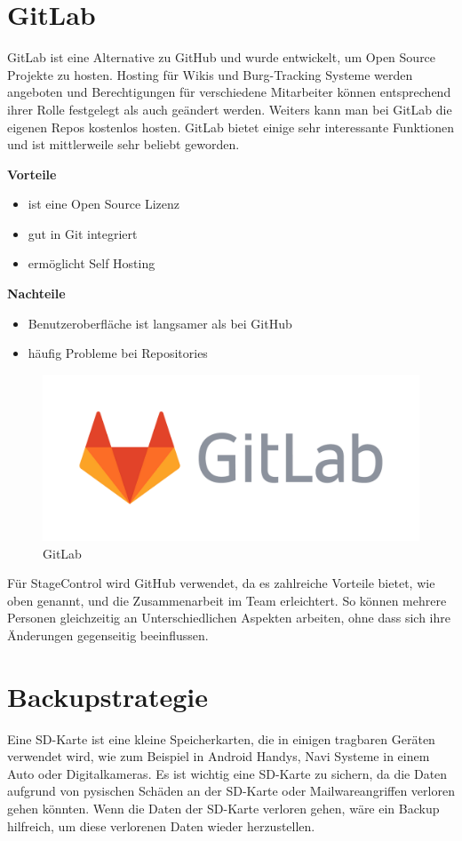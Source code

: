 \newpage
\section{GitLab}
GitLab ist eine Alternative zu GitHub und wurde entwickelt, um Open Source Projekte zu hosten. Hosting für Wikis und Burg-Tracking Systeme werden angeboten und Berechtigungen für verschiedene Mitarbeiter können entsprechend ihrer Rolle festgelegt als auch geändert werden. Weiters kann man bei GitLab die eigenen Repos kostenlos hosten. GitLab bietet einige sehr interessante Funktionen und ist mittlerweile sehr beliebt geworden.   \parencite{GitHubVsGitLab}

\textbf{Vorteile}
\begin{itemize}
	\item ist eine Open Source Lizenz
	\item gut in Git integriert
	\item ermöglicht Self Hosting
\end{itemize}

\textbf{Nachteile}
\begin{itemize}
	\item Benutzeroberfläche ist langsamer als bei GitHub
	\item häufig Probleme bei Repositories 
\end{itemize}


\begin{figure}[H]
	\centering
	\includegraphics[width=0.5\linewidth]{images/GitLab.png}
	\caption[GitLab]{GitLab}
	\label{fig:GitLab}
\end{figure}

Für StageControl wird GitHub verwendet, da es zahlreiche Vorteile bietet, wie oben genannt, und die Zusammenarbeit im Team erleichtert. So können mehrere Personen gleichzeitig an Unterschiedlichen Aspekten arbeiten, ohne dass sich ihre Änderungen gegenseitig beeinflussen.

\section{Backupstrategie}
Eine SD-Karte ist eine kleine Speicherkarten, die in einigen tragbaren Geräten verwendet wird, wie zum Beispiel in Android Handys, Navi Systeme in einem Auto oder Digitalkameras. Es ist wichtig eine SD-Karte zu sichern, da die Daten aufgrund von pysischen Schäden an der SD-Karte oder Mailwareangriffen verloren gehen könnten. Wenn die Daten der SD-Karte verloren gehen, wäre ein Backup hilfreich, um diese verlorenen Daten wieder herzustellen.  \parencite{SD-KartenSicherung}

